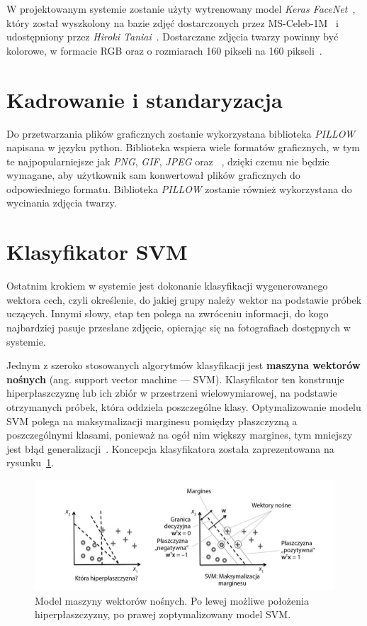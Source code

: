 W projektowanym systemie zostanie użyty wytrenowany model \textit{Keras FaceNet}~\cite{taniai-2018},
który został wyszkolony na bazie zdjęć dostarczonych przez MS-Celeb-1M~\cite{microsoft-2020-celeb1m}
i udostępniony przez \textit{Hiroki Taniai}~\cite{taniai-no-date}.
Dostarczane zdjęcia twarzy powinny być kolorowe, w formacie RGB oraz
o rozmiarach 160 pikseli na 160 pikseli~\cite{brownlee-2019}.


\section{Kadrowanie i standaryzacja}

Do przetwarzania plików graficznych zostanie wykorzystana biblioteka \textit{PILLOW} napisana w języku python.
Biblioteka wspiera wiele formatów graficznych,
w tym te najpopularniejsze jak \textit{PNG}, \textit{GIF}, \textit{JPEG} oraz ~\cite{pillow_doc},
dzięki czemu nie będzie wymagane, aby użytkownik sam konwertował plików graficznych do odpowiedniego formatu.
Biblioteka \textit{PILLOW} zostanie również wykorzystana do wycinania zdjęcia twarzy.

\pagebreak


\section{Klasyfikator SVM}

Ostatnim krokiem w systemie jest dokonanie klasyfikacji wygenerowanego wektora cech,
czyli określenie, do jakiej grupy należy wektor na podstawie próbek uczących.
Innymi słowy, etap ten polega na zwróceniu informacji, do kogo najbardziej pasuje przesłane zdjęcie,
opierając się na fotografiach dostępnych w systemie.

Jednym z szeroko stosowanych algorytmów klasyfikacji jest
\textbf{maszyna wektorów nośnych} (ang. support vector machine — SVM).
Klasyfikator ten konstruuje hiperpłaszczyznę lub ich zbiór w przestrzeni wielowymiarowej,
na podstawie otrzymanych próbek, która oddziela poszczególne klasy.
Optymalizowanie modelu SVM polega na maksymalizacji marginesu pomiędzy płaszczyzną a poszczególnymi klasami,
ponieważ na ogół nim większy margines, tym mniejszy jest błąd generalizacji~\cite{hastie2009elements}.
Koncepcja klasyfikatora została zaprezentowana na rysunku~\ref{fig:svm}.

\begin{figure}[H]
    \centering
    \includegraphics[width=1\textwidth]{images/smv}
    \caption{
        Model maszyny wektorów nośnych.
        Po lewej możliwe położenia hiperpłaszczyzny, po prawej zoptymalizowany model SVM.
    }
    \label{fig:svm}
\end{figure}


